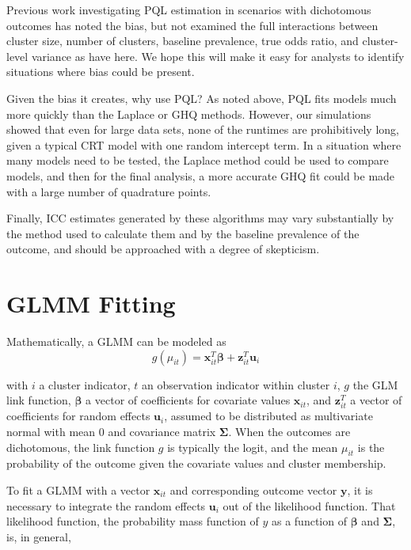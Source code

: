 \documentclass{article}
\begin{document}
\begin{flushleft}
Previous work investigating PQL estimation in scenarios with dichotomous outcomes has noted the bias\cite{jang_numerical_2009,zhang_fitting_2011}, but not examined the full interactions between cluster size, number of clusters, baseline prevalence, true odds ratio, and cluster-level variance as have here. We hope this will make it easy for analysts to identify situations where bias could be present.

Given the bias it creates, why use PQL? As noted above, PQL fits models much more quickly than the Laplace or GHQ methods. However, our simulations showed that even for large data sets, none of the runtimes are prohibitively long, given a typical CRT model with one random intercept term. In a situation where many models need to be tested, the Laplace method could be used to compare models, and then for the final analysis, a more accurate GHQ fit could be made with a large number of quadrature points.

Finally, ICC estimates generated by these algorithms may vary substantially by the method used to calculate them and by the baseline prevalence of the outcome, and should be approached with a degree of skepticism.











\appendix
\section{GLMM Fitting}
Mathematically, a GLMM can be modeled as
    \begin{equation}
        g(\mu_{it})=\mathbf{x}^T_{it} \boldsymbol{\beta} + \mathbf{z}^T_{it}\mathbf{u}_i
    \end{equation}
    
    with
 $i$ a cluster indicator, $t$ an observation indicator within cluster $i$, $g$ the GLM link function, $\boldsymbol{\beta}$ a vector of coefficients for covariate values $\mathbf{x}_{it}$, and $\mathbf{z}^T_{it}$ a vector of coefficients for random effects $\mathbf{u}_i$, assumed to be distributed as multivariate normal with mean $0$ and covariance matrix $\mathbf{\Sigma}$. When the outcomes are dichotomous, the link function $g$ is typically the logit, and the mean $\mu_{it}$ is the probability of the outcome given the covariate values and cluster membership.
 
To fit a GLMM with a vector $\mathbf{x}_{it}$ and corresponding outcome vector $\mathbf{y}$, it is necessary to integrate the random effects $\mathbf{u}_i$ out of the likelihood function\cite{rodriguez_assessment_1995}. That likelihood function, the probability mass function of $y$ as a function of $\boldsymbol{\beta}$ and $\mathbf{\Sigma}$\cite{agresti_categorical_2013}, is, in general,


\end{flushleft}
\end{document}
